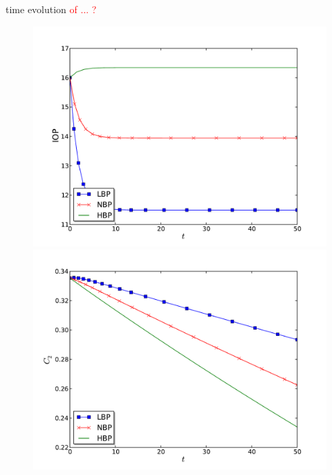 \begin{frame}{time evolution \textcolor{red}{of ... ?}}
\begin{figure}[H]
\begin{minipage}{0.45\linewidth}
\includegraphics[scale=0.27]{images/IOP_time}
\end{minipage}\hfill
\begin{minipage}{0.45\linewidth}
\includegraphics[scale=0.27]{images/C2_time}
\end{minipage}
\end{figure}

\end{frame}
